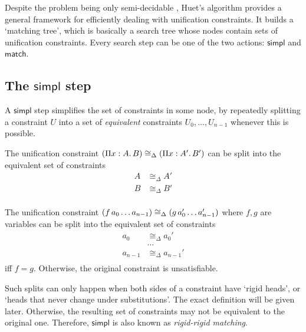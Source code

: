 \documentclass[twoside]{report}
\begin{document}
Despite the problem being only semi-decidable \cite{huet1973undecidability,goldfarb1981undecidability}, Huet's algorithm \cite{huet1975unification,elliott1990extensions} provides a general framework for efficiently dealing with unification constraints. It builds a `matching tree', which is basically a search tree whose nodes contain sets of unification constraints. Every search step can be one of the two actions: $\mathsf{simpl}$ and $\mathsf{match}$.

\subsection*{The $\mathsf{simpl}$ step}

A $\mathsf{simpl}$ step simplifies the set of constraints in some node, by repeatedly splitting a constraint $U$ into a set of \emph{equivalent} constraints $U_0, \ldots, U_{n-1}$ whenever this is possible.

\begin{example}
The unification constraint $(\Pi{x} : {A}.\,{B}) \cong_\Delta (\Pi{x} : {A'}.\,{B'})$ can be split into the equivalent set of constraints
$$
\begin{aligned}
A &\cong_\Delta A' \\
B &\cong_\Delta B' \\
\end{aligned}
$$
\end{example}

\begin{example}
The unification constraint $({{{f}\,{a_0}}\,{\ldots}}\,{a_{n-1}}) \cong_\Delta ({{{g}\,{a_0'}}\,{\ldots}}\,{a_{n-1}'})$ where $f, g$ are variables can be split into the equivalent set of constraints
$$
\begin{aligned}
a_0 &\cong_\Delta a_0' \\
&\ldots \\
a_{n-1} &\cong_\Delta a_{n-1}' \\
\end{aligned}
$$
iff $f = g$. Otherwise, the original constraint is unsatisfiable.
\end{example}

Such splits can only happen when both sides of a constraint have `rigid heads', or `heads that never change under substitutions'. The exact definition will be given later. Otherwise, the resulting set of constraints may not be equivalent to the original one. Therefore, $\mathsf{simpl}$ is also known as \emph{rigid-rigid matching}.
\end{document}
